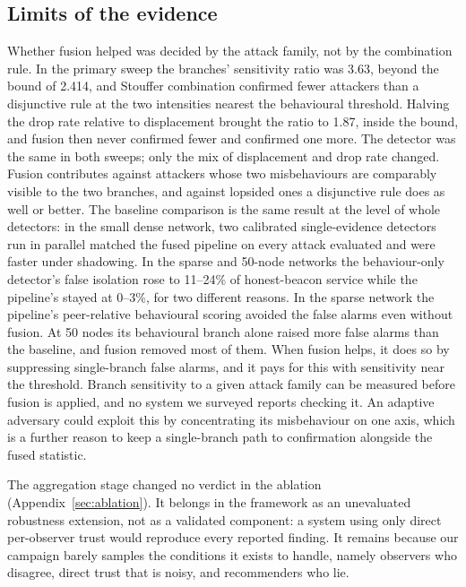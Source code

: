 \subsection{Limits of the evidence}

Whether fusion helped was decided by the attack family, not by the
combination rule. In the primary sweep the branches' sensitivity ratio was 3.63, beyond the
bound of 2.414, and Stouffer combination confirmed fewer attackers than a
disjunctive rule at the two intensities nearest the behavioural threshold.
Halving the drop rate relative to displacement brought the ratio to 1.87,
inside the bound, and fusion then never confirmed fewer and confirmed one more.
The detector was the same in both sweeps; only the mix of displacement and
drop rate changed. Fusion contributes against attackers whose two
misbehaviours are comparably visible to the two branches, and against
lopsided ones a disjunctive rule does as well or better. The baseline
comparison is the same result at the level of whole detectors: in the small
dense network, two calibrated single-evidence detectors run in parallel
matched the fused pipeline on every attack evaluated and were faster under
shadowing. In the sparse and 50-node networks the behaviour-only detector's
false isolation rose to 11--24\% of honest-beacon service while the
pipeline's stayed at 0--3\%, for two different reasons. In the sparse network
the pipeline's peer-relative behavioural scoring avoided the false alarms
even without fusion. At 50 nodes its behavioural branch alone raised more
false alarms than the baseline, and fusion removed most of them. When fusion
helps, it does so by suppressing single-branch false alarms, and it pays for
this with sensitivity near the threshold. Branch sensitivity to
a given attack family can be measured before fusion is applied, and no system
we surveyed reports checking it. An adaptive adversary could exploit this by
concentrating its misbehaviour on one axis, which is a further reason to
keep a single-branch path to confirmation alongside the fused statistic.

The aggregation stage changed no verdict in the ablation
(Appendix~\ref{sec:ablation}). It belongs in the framework
as an unevaluated robustness extension, not as a validated component: a system
using only direct per-observer trust would reproduce every reported finding.
It remains because our campaign barely samples the conditions it exists to
handle, namely observers who disagree, direct trust that is noisy, and
recommenders who lie.

